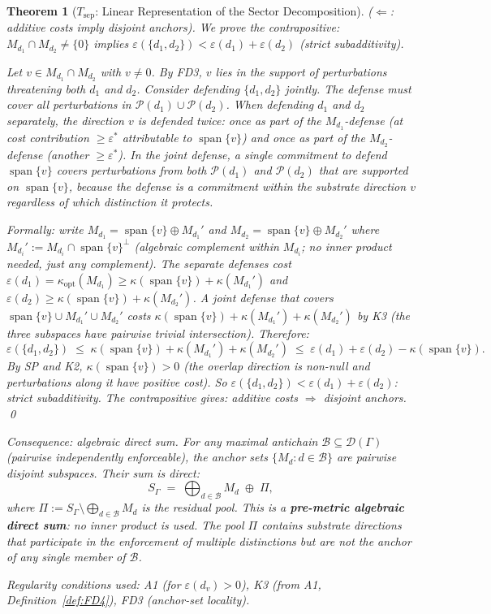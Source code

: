\documentclass[11pt,a4paper]{article}
\newtheorem{theorem}{Theorem}[section]
\theoremstyle{definition}
\newcommand{\eps}{\varepsilon}
\DeclareMathOperator{\spn}{span}
\begin{document}
\begin{theorem}[$T_{\mathrm{sep}}$: Linear Representation of the Sector Decomposition]
\smallskip
\textit{($\Leftarrow$: additive costs imply disjoint anchors).}  We prove the contrapositive: $M_{d_1} \cap M_{d_2} \ne \{0\}$ implies $\eps(\{d_1, d_2\}) < \eps(d_1) + \eps(d_2)$ (strict subadditivity).

Let $v \in M_{d_1} \cap M_{d_2}$ with $v \ne 0$.  By FD3, $v$ lies in the support of perturbations threatening both $d_1$ and $d_2$.  Consider defending $\{d_1, d_2\}$ jointly.  The defense must cover all perturbations in $\mathcal{P}(d_1) \cup \mathcal{P}(d_2)$.  When defending $d_1$ and $d_2$ separately, the direction $v$ is defended twice: once as part of the $M_{d_1}$-defense (at cost contribution $\ge \eps^*$ attributable to $\spn\{v\}$) and once as part of the $M_{d_2}$-defense (another $\ge \eps^*$).  In the joint defense, a single commitment to defend $\spn\{v\}$ covers perturbations from both $\mathcal{P}(d_1)$ and $\mathcal{P}(d_2)$ that are supported on $\spn\{v\}$, because the defense is a commitment within the substrate direction $v$ regardless of which distinction it protects.

Formally: write $M_{d_1} = \spn\{v\} \oplus M_{d_1}'$ and $M_{d_2} = \spn\{v\} \oplus M_{d_2}'$ where $M_{d_i}' := M_{d_i} \cap \spn\{v\}^\perp$ (algebraic complement within $M_{d_i}$; no inner product needed, just any complement).  The separate defenses cost $\eps(d_1) = \kappa_{\mathrm{opt}}(M_{d_1}) \ge \kappa(\spn\{v\}) + \kappa(M_{d_1}')$ and $\eps(d_2) \ge \kappa(\spn\{v\}) + \kappa(M_{d_2}')$.  A joint defense that covers $\spn\{v\} \cup M_{d_1}' \cup M_{d_2}'$ costs $\kappa(\spn\{v\}) + \kappa(M_{d_1}') + \kappa(M_{d_2}')$ by K3 (the three subspaces have pairwise trivial intersection).  Therefore:
\[
\eps(\{d_1,d_2\}) \;\le\; \kappa(\spn\{v\}) + \kappa(M_{d_1}') + \kappa(M_{d_2}') \;\le\; \eps(d_1) + \eps(d_2) - \kappa(\spn\{v\}).
\]
By SP and K2, $\kappa(\spn\{v\}) > 0$ (the overlap direction is non-null and perturbations along it have positive cost).  So $\eps(\{d_1,d_2\}) < \eps(d_1) + \eps(d_2)$: strict subadditivity.  The contrapositive gives: additive costs $\Rightarrow$ disjoint anchors.  \qed

\smallskip\noindent\textit{Consequence: algebraic direct sum.}  For any maximal antichain $\mathcal{B} \subseteq \mathcal{D}(\Gamma)$ (pairwise independently enforceable), the anchor sets $\{M_d : d \in \mathcal{B}\}$ are pairwise disjoint subspaces.  Their sum is direct:
\[
S_\Gamma \;=\; \bigoplus_{d \in \mathcal{B}} M_d \;\oplus\; \Pi,
\]
where $\Pi := S_\Gamma \setminus \bigoplus_{d \in \mathcal{B}} M_d$ is the residual pool.  This is a \textbf{pre-metric algebraic direct sum}: no inner product is used.  The pool $\Pi$ contains substrate directions that participate in the enforcement of multiple distinctions but are not the anchor of any single member of $\mathcal{B}$.

\noindent\textit{Regularity conditions used:} A1 (for $\eps(d_v) > 0$), K3 (from A1, Definition~\ref{def:FD4}), FD3 (anchor-set locality).
\end{theorem}
\end{document}
